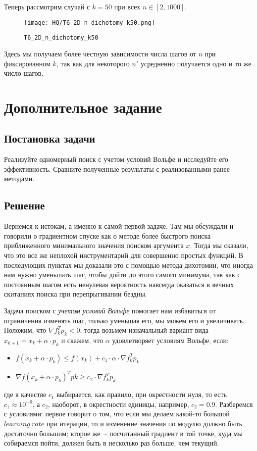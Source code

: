 \documentclass[12pt, a4paper, oneside, final]{article}
\begin{document}
	Теперь рассмотрим случай с $k = 50$ при всех $n \in [2, 1000]$.
	\begin{figure}[H]
		\centering
		\texttt{[image: HQ/T6\_2D\_n\_dichotomy\_k50.png]}
		\caption*{\texttt{T6\_2D\_n\_dichotomy\_k50}}
	\end{figure}
	Здесь мы получаем более честную зависимости числа шагов от $n$ при фиксированном $k$, так как для некоторого $n'$ усредненно получается одно и то же число шагов.
	\newpage
	\section*{Дополнительное задание}
	\subsection*{Постановка задачи}
	Реализуйте одномерный поиск с учетом условий Вольфе и исследуйте его эффективность. Сравните полученные результаты с реализованными ранее методами.
	\subsection*{Решение}
	Вернемся к истокам, а именно к самой первой задаче. Там мы обсуждали и говорили о градиентном спуске как о методе более быстрого поиска приближенного минимального значения поиском аргумента $x$. Тогда мы сказали, что это все же неплохой инструментарий для совершенно простых функций. В последующих пунктах мы доказали это с помощью метода дихотомии, что иногда нам нужно уменьшать шаг, чтобы дойти до этого самого минимума, так как с постоянным шагом есть ненулевая вероятность навсегда оказаться в вечных скитаниях поиска при перепрыгивании бездны.

	Задача поиском с \textit{учетом условий Вольфе} помогает нам избавиться от ограничения изменять шаг, только уменьшая его, мы можем его и увеличивать. Положим, что $\nabla{f^{T}_{k}p_{k}} < 0$, тогда возьмем изначальный вариант вида $x_{k + 1} = x_{k} + \alpha \cdot p_{k}$ и скажем, что $\alpha$ удовлетворяет условиям Вольфе, если:
	\begin{itemize}
		\item $f(x_{k} + \alpha \cdot p_{k}) \leqslant f(x_{k}) + c_{1} \cdot \alpha \cdot \nabla{f^{T}_{k}p_{k}}$
		\item $\nabla{f(x_{k} + \alpha \cdot p_{k})^{T}p{k}} \geqslant c_{2} \cdot \nabla{f^{T}_{k}p_{k}}$
	\end{itemize}
	где в качестве $c_{1}$ выбирается, как правило, при окрестности нуля, то есть $c_{1} \approx 10^{-6}$, а $c_{2}$, наоборот, в окрестности единицы, например, $c_{2} = 0.9$. Разберемся с условиями: первое говорит о том, что если мы делаем какой-то большой $learning~rate$ при итерации, то и изменение значения по модулю должно быть достаточно большим; второе же~-- посчитанный градиент в той точке, куда мы собираемся пойти, должен быть в несколько раз больше, чем текущий.
\end{document}
